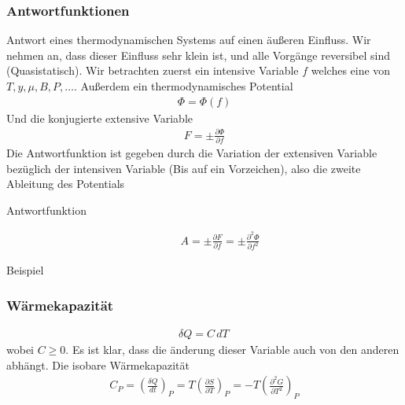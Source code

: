 \documentclass[11pt]{article}
\theoremstyle{plain}
\theoremstyle{mytheoremstyle}
\newcommand{\pd}[2]{\frac{\partial #1 }{\partial #2}}
\renewcommand{\d}[1]{\,d#1\,}
\begin{document}
\subsubsection*{Antwortfunktionen}
Antwort eines thermodynamischen Systems auf einen äußeren Einfluss.
Wir nehmen an, dass dieser Einfluss sehr klein ist, und alle Vorgänge
reversibel sind (Quasistatisch). Wir betrachten zuerst ein intensive Variable
$f$ welches eine von $T, y, \mu, B, P, \ldots $.
Außerdem ein thermodynamisches Potential 
%
\begin{align*}
  \Phi = \Phi(f)
\end{align*}
%
Und die konjugierte extensive Variable 
%
\begin{align*}
  F = \pm \pd{\Phi}{f}
\end{align*}
%
Die Antwortfunktion ist gegeben durch die Variation der extensiven Variable
bezüglich der intensiven Variable (Bis auf ein Vorzeichen), also 
die zweite Ableitung des Potentials
\begin{description}
  \item[Antwortfunktion] 
    \begin{align*}
      A = \pm \pd{F}{f} = \pm \pd{^2 \Phi}{f^2}
    \end{align*}
\end{description}
Beispiel
\subsubsection*{Wärmekapazität}
%
\begin{align*}
  \delta Q = C \d{T}
\end{align*}
%
wobei $C \ge 0$.
Es ist klar, dass die änderung dieser Variable auch von den anderen abhängt.
Die isobare Wärmekapazität %
\begin{align*}
  C_P =(\frac{ \delta Q}{ \d{t}})_P = T \left( \pd{S}{T} \right)_P =
  - T \left( \pd{^2 G}{T^2} \right)_P
\end{align*}
%
\end{document}
